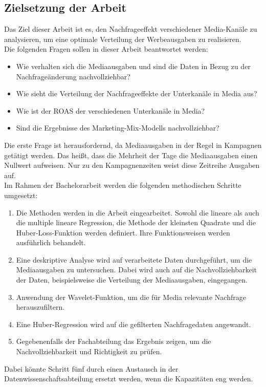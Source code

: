 \subsection{Zielsetzung der Arbeit}
\label{ZielsetzungDerArbeit}
Das Ziel dieser Arbeit ist es, den Nachfrageeffekt verschiedener Media-Kanäle zu analysieren, um eine optimale Verteilung der Werbeausgaben zu realisieren. \\
Die folgenden Fragen sollen in dieser Arbeit beantwortet werden:
\begin{itemize}
    \item Wie verhalten sich die Mediaausgaben und sind die Daten in Bezug zu der Nachfrageänderung nachvollziehbar? 
    \item Wie sieht die Verteilung der Nachfrageeffekte der Unterkanäle in Media aus?
    \item  Wie ist der ROAS der verschiedenen Unterkanäle in Media?
    \item Sind die Ergebnisse des Marketing-Mix-Modells nachvollziehbar? 
\end{itemize} 
Die erste Frage ist herausfordernd, da Mediaausgaben in der Regel in Kampagnen getätigt werden. Das heißt, dass die Mehrheit der Tage die Mediaausgaben einen Nullwert aufweisen. Nur zu den Kampagnenzeiten weist diese Zeitreihe Ausgaben auf.\\
Im Rahmen der Bachelorarbeit werden die folgenden methodischen Schritte umgesetzt:
\begin{enumerate}
    \item Die Methoden werden in die Arbeit eingearbeitet. Sowohl die lineare als auch die multiple lineare Regression, die Methode der kleinsten Quadrate und die Huber-Loss-Funktion werden definiert. Ihre Funktionsweisen werden ausführlich behandelt.
    \item Eine deskriptive Analyse wird auf verarbeitete Daten durchgeführt, um die Mediaausgaben zu untersuchen. Dabei wird auch auf die Nachvollziehbarkeit der Daten, beispielsweise die Verteilung der Mediaausgaben, eingegangen.
    \item Anwendung der Wavelet-Funktion, um die für Media relevante Nachfrage herauszufiltern.
    \item Eine Huber-Regression wird auf die gefilterten Nachfragedaten angewandt.
    \item Gegebenenfalls der Fachabteilung das Ergebnis zeigen, um die Nachvollziehbarkeit und Richtigkeit zu prüfen.
\end{enumerate}
Dabei könnte Schritt fünf durch einen Austausch in der Datenwissenschaftsabteilung ersetzt werden, wenn die Kapazitäten eng werden.   
